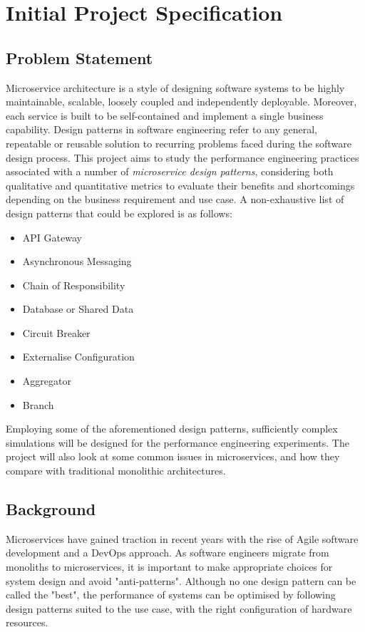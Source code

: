 \section{Initial Project Specification}

\subsection{Problem Statement}
Microservice architecture is a style of designing software systems to be highly maintainable, scalable, loosely coupled and independently deployable. Moreover, each service is built to be self-contained and implement a single business capability. Design patterns in software engineering refer to any general, repeatable or reusable solution to recurring problems faced during the software design process. This project aims to study the performance engineering practices associated with a number of \textit{microservice design patterns}, considering both qualitative and quantitative metrics to evaluate their benefits and shortcomings depending on the business requirement and use case. A non-exhaustive list of design patterns that could be explored is as follows:

\begin{itemize}
  \item API Gateway
  \item Asynchronous Messaging
  \item Chain of Responsibility
  \item Database or Shared Data
  \item Circuit Breaker
  \item Externalise Configuration
  \item Aggregator
  \item Branch
\end{itemize}

Employing some of the aforementioned design patterns, sufficiently complex simulations will be designed for the performance engineering experiments. The project will also look at some common issues in microservices, and how they compare with traditional monolithic architectures.

\subsection{Background}
Microservices have gained traction in recent years with the rise of Agile software development and a DevOps \cite{awsDevOps} approach. As software engineers migrate from monoliths to microservices, it is important to make appropriate choices for system design and avoid "anti-patterns". Although no one design pattern can be called the "best", the performance of systems can be optimised by following design patterns suited to the use case, with the right configuration of hardware resources.

